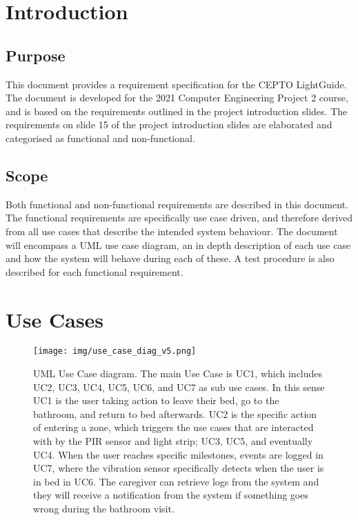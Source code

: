 \pagebreak
\tableofcontents

\hypersetup{
    linkcolor=winered,
}

\newpage
\section{Introduction}
\subsection{Purpose}
This document provides a requirement specification for the CEPTO LightGuide. The document is developed for the 2021 Computer Engineering Project 2 course, and is based on the requirements outlined in the project introduction slides\cite{proj-desc}. The requirements on slide 15 of the project introduction slides\cite{proj-desc} are elaborated and categorised as functional and non-functional.
\subsection{Scope}
    Both functional and non-functional requirements are described in this document. The functional requirements are specifically use case driven, and therefore derived from all use cases that describe the intended system behaviour. The document will encompass a UML use case diagram, an in depth description of each use case and how the system will behave during each of these. A test procedure is also described for each functional requirement.

\section{Use Cases}
\label{sec:use_cases}
    \begin{figure}[H]
        \centering
        \texttt{[image: img/use\_case\_diag\_v5.png]}
        \caption{UML Use Case diagram. The main Use Case is UC1, which includes UC2, UC3, UC4, UC5, UC6, and UC7 as sub use cases. In this sense UC1 is the user taking action to leave their bed, go to the bathroom, and return to bed afterwards. UC2 is the specific action of entering a zone, which triggers the use cases that are interacted with by the PIR sensor and light strip; UC3, UC5, and eventually UC4. When the user reaches specific milestones, events are logged in UC7, where the vibration sensor specifically detects when the user is in bed in UC6. The caregiver can retrieve logs from the system and they will receive a notification from the system if something goes wrong during the bathroom visit.}
        \label{fig:use-case-diag}
    \end{figure}
    
